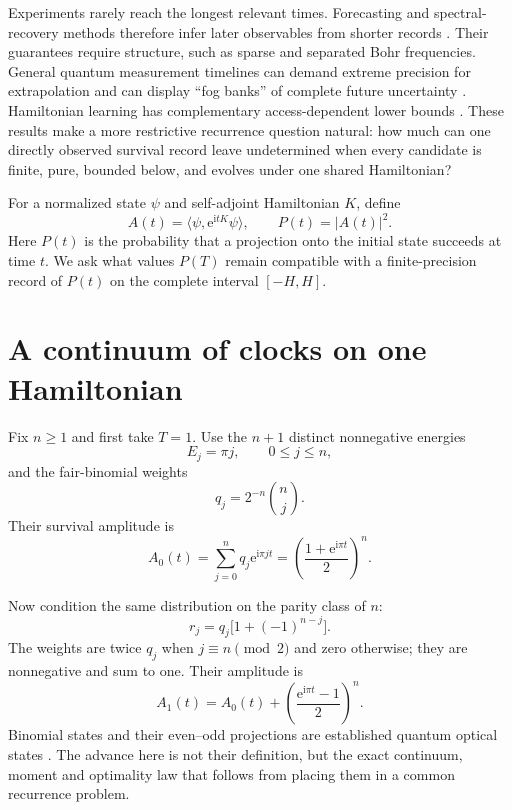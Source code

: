 \documentclass[12pt]{article}
\newcommand{\ee}{\mathrm e}
\newcommand{\ii}{\mathrm i}
\begin{document}
Experiments rarely reach the longest relevant times. Forecasting and
spectral-recovery methods therefore infer later observables from shorter
records \cite{Sornsaeng2024,Valls2026}. Their guarantees require structure,
such as sparse and separated Bohr frequencies. General quantum measurement
timelines can demand extreme precision for extrapolation and can display
``fog banks'' of complete future uncertainty \cite{Manos2026}. Hamiltonian
learning has complementary access-dependent lower bounds
\cite{ChenLi2026}. These results make a more restrictive recurrence question
natural: how much can one directly observed survival record leave
undetermined when every candidate is finite, pure, bounded below, and
evolves under one shared Hamiltonian?

For a normalized state \(\psi\) and self-adjoint Hamiltonian \(K\), define
\begin{equation}
 A(t)=\langle\psi,\ee^{\ii tK}\psi\rangle,\qquad
 P(t)=|A(t)|^2 .
\label{eq:survival}
\end{equation}
Here \(P(t)\) is the probability that a projection onto the initial state
succeeds at time \(t\). We ask what values \(P(T)\) remain compatible with a
finite-precision record of \(P(t)\) on the complete interval
\([-H,H]\).

\section*{A continuum of clocks on one Hamiltonian}

Fix \(n\geq1\) and first take \(T=1\). Use the \(n+1\) distinct
nonnegative energies
\begin{equation}
 E_j=\pi j,\qquad 0\leq j\leq n,
\label{eq:energies}
\end{equation}
and the fair-binomial weights
\begin{equation}
 q_j=2^{-n}{n\choose j}.
\label{eq:fullweight}
\end{equation}
Their survival amplitude is
\begin{equation}
 A_0(t)=\sum_{j=0}^{n}q_j\ee^{\ii\pi jt}
 =\left(\frac{1+\ee^{\ii\pi t}}2\right)^n .
\label{eq:A0}
\end{equation}

Now condition the same distribution on the parity class of \(n\):
\begin{equation}
 r_j=q_j\bigl[1+(-1)^{n-j}\bigr].
\label{eq:parityweight}
\end{equation}
The weights are twice \(q_j\) when \(j\equiv n\pmod2\) and zero otherwise;
they are nonnegative and sum to one. Their amplitude is
\begin{equation}
 A_1(t)=A_0(t)+
 \left(\frac{\ee^{\ii\pi t}-1}{2}\right)^n .
\label{eq:A1}
\end{equation}
Binomial states and their even--odd projections are established quantum
optical states \cite{Stoler1985,Zhang2009}. The advance here is not their
definition, but the exact continuum, moment and optimality law that follows
from placing them in a common recurrence problem.
\end{document}
